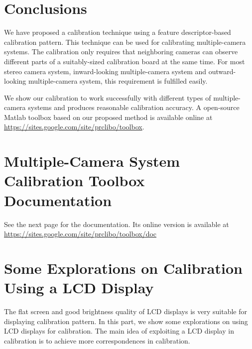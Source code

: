 \documentclass{report}
\begin{document}
\chapter{Conclusions}
We have proposed a calibration technique using a feature descriptor-based calibration pattern. This technique can be used for calibrating multiple-camera systems. The calibration only requires that neighboring cameras can observe different parts of a suitably-sized calibration board at the same time. For most stereo camera system, inward-looking multiple-camera system and outward-looking multiple-camera system, this requirement is fulfilled easily. 

We show our calibration to work successfully with different types of multiple-camera systems and produces reasonable calibration accuracy. A open-source Matlab toolbox based on our proposed method is available online at {\small{\url{https://sites.google.com/site/prclibo/toolbox}}}. 


\appendix
\chapter{Multiple-Camera System Calibration Toolbox Documentation}

See the next page for the documentation. Its online version is available at {\small{\url{https://sites.google.com/site/prclibo/toolbox/doc}}}



\chapter{Some Explorations on Calibration Using a LCD Display}
The flat screen and good brightness quality of LCD displays is very suitable for displaying calibration pattern. In this part, we show some explorations on using LCD displays for calibration. The main idea of exploiting a LCD display in calibration is to achieve more correspondences in calibration. 
\end{document}

